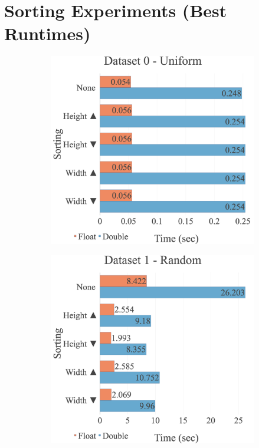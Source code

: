 \section{Sorting Experiments (Best Runtimes)}
\label{appendix:option:sorting}
\begin{figure}[H]
\begin{adjustwidth}{-2cm}{-2cm}
\centering
\begin{subfigure}{.62\textwidth}
    \centering
    \includegraphics[width=1\textwidth]{img/experiments/option-sorts-0_UNIFORM.png}
\end{subfigure}
\begin{subfigure}{.62\textwidth}
    \centering
    \includegraphics[width=1\textwidth]{img/experiments/option-sorts-1_RAND.png}

\end{subfigure}
\end{adjustwidth}
\end{figure}
